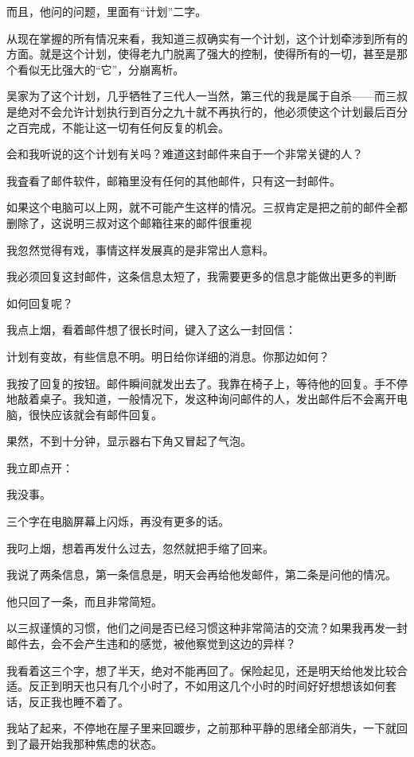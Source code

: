 而且，他问的问题，里面有“计划”二字。

从现在掌握的所有情况来看，我知道三叔确实有一个计划，这个计划牵涉到所有的方面。就是这个计划，使得老九门脱离了强大的控制，使得所有的一切，甚至是那个看似无比强大的“它”，分崩离析。

吴家为了这个计划，几乎牺牲了三代人一当然，第三代的我是属于自杀——而三叔是绝对不会允许计划执行到百分之九十就不再执行的，他必须使这个计划最后百分之百完成，不能让这一切有任何反复的机会。

会和我听说的这个计划有关吗？难道这封邮件来自于一个非常关键的人？

我査看了邮件软件，邮箱里没有任何的其他邮件，只有这一封邮件。

如果这个电脑可以上网，就不可能产生这样的情况。三叔肯定是把之前的邮件全都删除了，这说明三叔对这个邮箱往来的邮件很重视

我忽然觉得有戏，事情这样发展真的是非常出人意料。

我必须回复这封邮件，这条信息太短了，我需要更多的信息才能做出更多的判断

如何回复呢？

我点上烟，看着邮件想了很长时间，键入了这么一封回信：

计划有变故，有些信息不明。明日给你详细的消息。你那边如何？

我按了回复的按钮。邮件瞬间就发出去了。我靠在椅子上，等待他的回复。手不停地敲着桌子。我知道，一般情况下，发这种询问邮件的人，发出邮件后不会离开电脑，很快应该就会有邮件回复。

果然，不到十分钟，显示器右下角又冒起了气泡。

我立即点开：

我没事。

三个字在电脑屏幕上闪烁，再没有更多的话。

我叼上烟，想着再发什么过去，忽然就把手缩了回来。

我说了两条信息，第一条信息是，明天会再给他发邮件，第二条是问他的情况。

他只回了一条，而且非常简短。

以三叔谨慎的习惯，他们之间是否已经习惯这种非常简洁的交流？如果我再发一封邮件去，会不会产生违和的感觉，被他察觉到这边的异样？

我看着这三个字，想了半天，绝对不能再回了。保险起见，还是明天给他发比较合适。反正到明天也只有几个小时了，不如用这几个小时的时间好好想想该如何套话，反正我也睡不着了。

我站了起来，不停地在屋子里来回踱步，之前那种平静的思绪全部消失，一下就回到了最开始我那种焦虑的状态。

